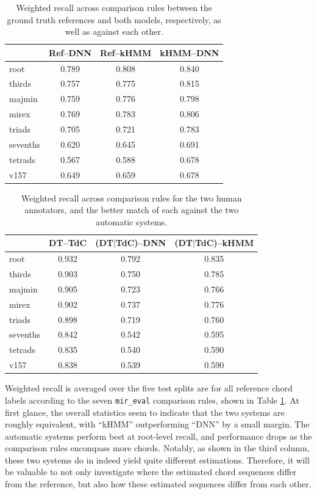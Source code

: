 \documentclass{article}
\begin{document}
\begin{table}[!t]
\small
\centering
\begin{tabular}{l||ccc}
          & Ref--DNN & Ref--kHMM & kHMM--DNN \\
\hline
root      & 0.789      & 0.808       & 0.840       \\
thirds    & 0.757      & 0.775       & 0.815       \\
majmin    & 0.759      & 0.776       & 0.798       \\
mirex     & 0.769      & 0.783       & 0.806       \\
triads    & 0.705      & 0.721       & 0.783       \\
sevenths  & 0.620      & 0.645       & 0.691       \\
tetrads   & 0.567      & 0.588       & 0.678       \\
v157      & 0.649      & 0.659       & 0.678       \\
\hline
\end{tabular}
\caption{Weighted recall across comparison rules between the ground truth references and both models, respectively, as well as against each other.}
\label{tab:test_performance}
\end{table}

\begin{table}[!t]
\small
\centering
\begin{tabular}{l||ccc}
            & DT--TdC & (DT$|$TdC)--DNN & (DT$|$TdC)--kHMM \\
\hline
root        & 0.932 & 0.792 & 0.835 \\
thirds      & 0.903 & 0.750 & 0.785 \\
majmin      & 0.905 & 0.723 & 0.766 \\
mirex       & 0.902 & 0.737 & 0.776 \\
triads      & 0.898 & 0.719 & 0.760 \\
sevenths    & 0.842 & 0.542 & 0.595 \\
tetrads     & 0.835 & 0.540 & 0.590 \\
v157        & 0.838 & 0.539 & 0.590 \\
\hline
\end{tabular}
\caption{Weighted recall across comparison rules for the two human annotators, and the better match of each against the two automatic systems.}
\label{tab:rc_performance}
\end{table}

Weighted recall is averaged over the five test splits are for all reference chord labels according to the seven \texttt{mir\_eval} comparison rules, shown in Table \ref{tab:test_performance}.
At first glance, the overall statistics seem to indicate that the two systems are roughly equivalent, with ``kHMM'' outperforming ``DNN'' by a small margin.
The automatic systems perform best at root-level recall, and performance drops as the comparison rules encompass more chords.
Notably, as shown in the third column, these two systems do in indeed yield quite different estimations.
Therefore, it will be valuable to not only investigate where the estimated chord sequences differ from the reference, but also how these estimated sequences differ from each other.
\end{document}
